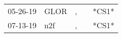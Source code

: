 \begin{supertabular}{lllll}
 05-26-19 &  GLOR &  , &   &  *CS1* \\
 07-13-19 &   n2f &  , &   &  *CS1* \\
\end{supertabular}
